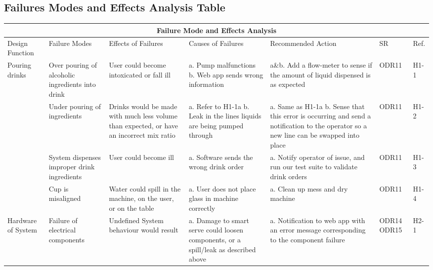 \documentclass{article}
\begin{document}
    \subsection{Failures Modes and Effects Analysis Table}

    \begin{rotate}{}
    
    \begin{landscape}
        \begin{table}
           \begin{tabular}{|p{1.75cm}|p{4cm}|p{4cm}|p{4cm}|p{4cm}|p{1cm}|p{0.75cm}|}
            \hline
            \multicolumn{7}{|c|}{Failure Mode and Effects Analysis} \\
            \hline
            Design Function & Failure Modes & Effects of Failures & Causes of Failures & Recommended Action & SR & Ref.  \\ [0.5ex]
            \hline\hline
            Pouring drinks & Over pouring of alcoholic ingredients into drink & User could become intoxicated or fall ill & a. Pump malfunctions \newline b. Web app sends wrong information  & a\&b. Add a flow-meter to sense if the amount of liquid dispensed is as expected & ODR11 & H1-1 \\
            \cline{2-7}
            & Under pouring of ingredients & Drinks would be made with much less volume than expected, or have an incorrect mix ratio & a. Refer to H1-1a \newline b. Leak in the lines liquids are being pumped through & a. Same as H1-1a \newline b. Sense that this error is occurring and send a notification to the operator so a new line can be swapped into place & ODR11 & H1-2 \\
            \cline{2-7}
            & System dispenses improper drink ingredients & User could become ill & a. Software sends the wrong drink order & a. Notify operator of issue, and run our test suite to validate drink orders & ODR11 & H1-3  \\
            \cline{2-7}
                & Cup is misaligned & Water could spill in the machine, on the user, or on the table & a. User does not place glass in machine correctly & a. Clean up mess and dry machine & ODR11 & H1-4  \\
            \hline
            Hardware of System & Failure of electrical components & Undefined System behaviour would result & a. Damage to smart serve could loosen components, or a spill/leak as described above & a. Notification to web app with an error message corresponding to the component failure & ODR14 ODR15 & H2-1\\

\end{tabular}
\end{table}
\end{landscape}
\end{rotate}
\end{document}
